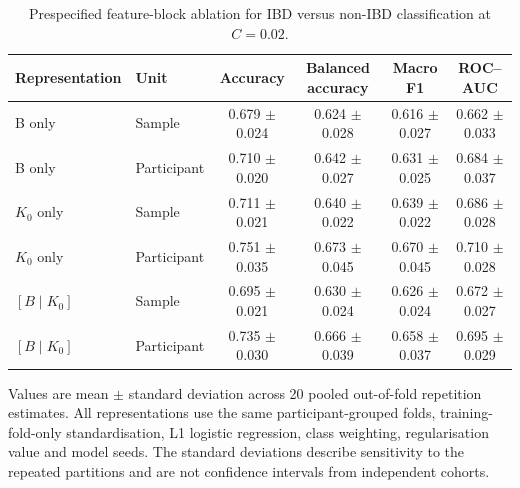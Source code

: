 \begin{table}[htbp]
\centering
\small
\caption{Prespecified feature-block ablation for IBD versus non-IBD classification at $C=0.02$.}
\label{tab:ricci_feature_block_ablation}
\begin{tabular}{llcccc}
\toprule
Representation & Unit & Accuracy & Balanced accuracy & Macro F1 & ROC--AUC \\
\midrule
B only & Sample & 0.679 $\pm$ 0.024 & 0.624 $\pm$ 0.028 & 0.616 $\pm$ 0.027 & 0.662 $\pm$ 0.033 \\
B only & Participant & 0.710 $\pm$ 0.020 & 0.642 $\pm$ 0.027 & 0.631 $\pm$ 0.025 & 0.684 $\pm$ 0.037 \\
$K_0$ only & Sample & 0.711 $\pm$ 0.021 & 0.640 $\pm$ 0.022 & 0.639 $\pm$ 0.022 & 0.686 $\pm$ 0.028 \\
$K_0$ only & Participant & 0.751 $\pm$ 0.035 & 0.673 $\pm$ 0.045 & 0.670 $\pm$ 0.045 & 0.710 $\pm$ 0.028 \\
$[B\mid K_0]$ & Sample & 0.695 $\pm$ 0.021 & 0.630 $\pm$ 0.024 & 0.626 $\pm$ 0.024 & 0.672 $\pm$ 0.027 \\
$[B\mid K_0]$ & Participant & 0.735 $\pm$ 0.030 & 0.666 $\pm$ 0.039 & 0.658 $\pm$ 0.037 & 0.695 $\pm$ 0.029 \\
\bottomrule
\end{tabular}
\begin{minipage}{0.96\linewidth}
\footnotesize
Values are mean $\pm$ standard deviation across 20 pooled out-of-fold repetition estimates. All representations use the same participant-grouped folds, training-fold-only standardisation, L1 logistic regression, class weighting, regularisation value and model seeds. The standard deviations describe sensitivity to the repeated partitions and are not confidence intervals from independent cohorts.
\end{minipage}
\end{table}
